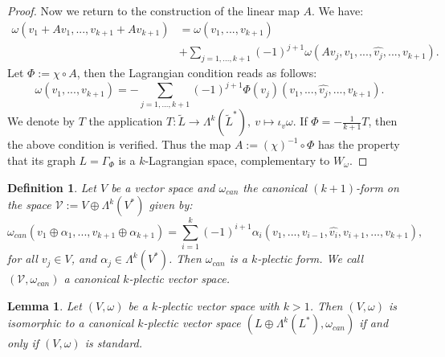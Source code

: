 \documentclass[a4paper,12pt,leqno]{article}
\newtheorem{lem}{Lemma}
\newtheorem{defa}{Definition}
\begin{document}
\begin{proof}
\noindent Now we return to the construction of the linear map $A$. We have:
\begin{align*}
\omega(v_1+A v_1,...,v_{k+1}+A v_{k+1})&=\omega(v_1,...,v_{k+1}) \\
&+ \sum_{j=1,...,k+1} (-1)^{j+1}\omega(Av_j,v_1,...,\widehat{v_j},...,v_{k+1}).
\end{align*}
Let $\Phi:=\chi\circ A$, then the Lagrangian condition reads as follows:
\begin{equation*}
\omega(v_1,...,v_{k+1})=- \sum_{j=1,...,k+1} (-1)^{j+1}\Phi(v_j)(v_1,...,\widehat{v_j},...,v_{k+1}).
\end{equation*}
We denote by $T$ the application $T:\widetilde{L}\rightarrow \Lambda^k(\widetilde{L}^*), \ v\mapsto \iota_v\omega$. 
If $\Phi=-\frac{1}{k+1}T$, then the above condition is verified. Thus the map $A:=(\chi)^{-1}\circ \Phi$ 
has the property that its graph $L=\Gamma_{\Phi}$ is a $k$-Lagrangian space, complementary to $W_{\omega}$.
\end{proof}

\begin{defa}
Let $V$ be a vector space and $\omega_{can}$ the canonical $(k{+}1)$-form on the space $\mathcal{V}:=V\oplus \Lambda^k(V^*)$
given by:
\begin{equation*}
\omega_{can}(v_1\oplus \alpha_1,...,v_{k+1}\oplus\alpha_{k+1})=
\sum_{i=1}^k (-1)^{i+1}\alpha_{i}(v_1,...,v_{i{-}1},\widehat{v_i},v_{i+1},...,v_{k+1}),
\end{equation*}
for all $v_j\in V$, and $\alpha_j\in \Lambda^k(V^*)$. Then $\omega_{can}$ is a $k$-plectic form. We call $(\mathcal{V},\omega_{can})$ 
a canonical 
$k$-plectic vector space. 
\end{defa}




\begin{lem}
Let $(V,\omega)$ be a $k$-plectic vector space with $k>1$. Then $(V,\omega)$ is isomorphic to a canonical  $k$-plectic vector space 
$(L\oplus\Lambda^k(L^*),\omega_{can})$ if and only if $(V,\omega)$ is standard.
\end{lem}
\end{document}
